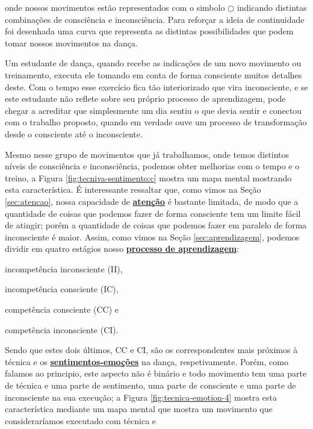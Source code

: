 onde nossos movimentos estão representados com o simbolo $\bigcirc$
indicando distintas combinações de consciência e inconsciência.
Para reforçar a ideia de continuidade foi desenhada uma curva que representa as 
distintas possibilidades que podem tomar nossos movimentos na dança.
\begin{example} Um estudante de dança, quando recebe
as indicações de um novo movimento ou treinamento, 
executa ele tomando em conta de forma consciente muitos detalhes deste.
Com o tempo esse exercício fica tão interiorizado que vira inconsciente,
e se este estudante não reflete sobre seu próprio processo de aprendizagem, pode chegar a acreditar 
que simplesmente um dia sentiu o que devia sentir e conectou com o trabalho proposto,
quando em verdade ouve um processo de transformação desde o consciente até o inconsciente.
\end{example}
Mesmo nesse grupo de movimentos que já trabalhamos, 
onde temos distintos níveis de consciência  e inconsciência,
podemos obter melhorias com o tempo e o treino, a Figura \ref{fig:tecniva-sentimento:c} 
mostra um mapa mental mostrando esta característica.
É interessante ressaltar que, como vimos na Seção \ref{sec:atencao}, 
nossa capacidade de \hyperref[sec:atencao]{\textbf{atenção}} 
é bastante limitada, de modo que a quantidade de coisas que podemos fazer de forma consciente 
tem um limite fácil de atingir; porém a quantidade de coisas que podemos fazer em paralelo de 
forma inconsciente é maior.
Assim, como vimos na Seção \ref{sec:aprendizagem}, 
podemos dividir em quatro estágios nosso \hyperref[sec:aprendizagem]{\textbf{processo de aprendizagem}}:
\begin{inparaitem}
\item incompetência inconsciente (II), \item incompetência consciente (IC), 
\item competência consciente (CC) e \item competência inconsciente (CI).
\end{inparaitem}
Sendo que estes dois últimos, CC e CI, 
são os correspondentes mais próximos à técnica e os 
\hyperref[ref:emotionsentimental]{\textbf{sentimentos-emoções}} na dança, respetivamente. 
Porém, como falamos ao principio, este aspecto não é binário e todo movimento 
tem uma parte de técnica e uma parte de sentimento, 
uma parte de consciente e uma parte de inconsciente na sua execução;
a Figura \ref{fig:tecnica-emotion-4} mostra esta característica mediante um mapa mental
que mostra um movimento que consideraríamos executado com técnica e 
